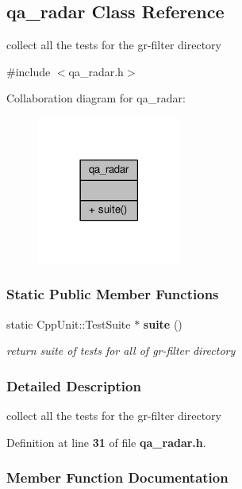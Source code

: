 \subsection{qa\+\_\+radar Class Reference}
\label{classqa__radar}


collect all the tests for the gr-\/filter directory  




{\ttfamily \#include $<$qa\+\_\+radar.\+h$>$}



Collaboration diagram for qa\+\_\+radar\+:
\nopagebreak
\begin{figure}[H]
\begin{center}
\leavevmode
\includegraphics[width=134pt]{d9/d06/classqa__radar__coll__graph}
\end{center}
\end{figure}
\subsubsection*{Static Public Member Functions}
\begin{DoxyCompactItemize}
\item 
static Cpp\+Unit\+::\+Test\+Suite $\ast$ {\bf suite} ()
\begin{DoxyCompactList}\small\item\em return suite of tests for all of gr-\/filter directory \end{DoxyCompactList}\end{DoxyCompactItemize}


\subsubsection{Detailed Description}
collect all the tests for the gr-\/filter directory 

Definition at line {\bf 31} of file {\bf qa\+\_\+radar.\+h}.



\subsubsection{Member Function Documentation}

